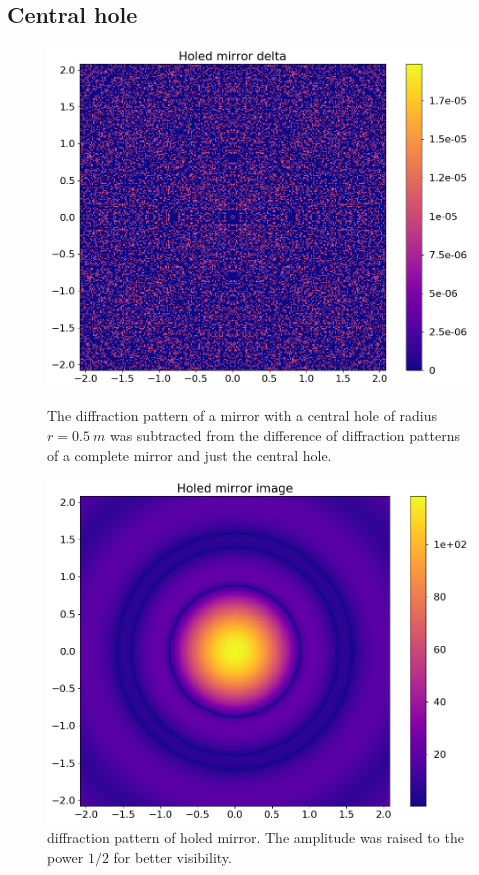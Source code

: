 \documentclass{article}
\begin{document}
\subsection{Central hole}\label{sec:res:hole}
\begin{figure}
    \centering
    \begin{minipage}{0.48\textwidth}
        \centering
        \includegraphics[width=\textwidth]{pictures/hole/delta2.png}
        \caption{The diffraction pattern of a mirror with a central hole of radius $r=\SI{0.5}{m}$ was subtracted from the difference of diffraction patterns of a complete mirror and just the central hole.}\label{fig:hole-delta}
    \end{minipage}%
    \hfill
    \begin{minipage}{0.48\textwidth}
        \centering
        \includegraphics[width=\textwidth]{pictures/hole/image.png}
        \caption{diffraction pattern of holed mirror. The amplitude was raised to the power $1/2$ for better visibility.}\label{fig:hole}
    \end{minipage}
\end{figure}
\end{document}
